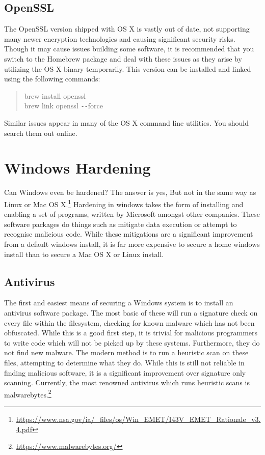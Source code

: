 \documentclass[a4paper,11pt]{report}
\begin{document}
			\subsection{OpenSSL}
				The OpenSSL version shipped with OS X is vastly out of date, not supporting many newer encryption technologies and causing significant security risks. 
				Though it may cause issues building some software, it is recommended that you switch to the Homebrew package and deal with these issues as they arise by utilizing the OS X binary temporarily.
				This version can be installed and linked using the following commands:
				\begin{quote}
					brew install openssl \\
					brew link openssl \verb+--+force
				\end{quote}
				Similar issues appear in many of the OS X command line utilities. 
				You should search them out online. 
	\section{Windows Hardening}
		Can Windows even be hardened? The answer is yes, But not in the same way as Linux or Mac OS X.\footnote{\url{https://www.nsa.gov/ia/\_files/os/Win\_EMET/I43V\_EMET\_Rationale\_v3.4.pdf}}
		Hardening in windows takes the form of installing and enabling a set of programs, written by Microsoft amongst other companies. 
		These software packages do things such as mitigate data execution or attempt to recognise malicious code. 
		While these mitigations are a significant improvement from a default windows install, it is far more expensive to secure a home windows install than to secure a Mac OS X or Linux install. 
		\subsection{Antivirus}
			The first and easiest means of securing a Windows system is to install an antivirus software package. 
			The most basic of these will run a signature check on every file within the filesystem, checking for known malware which has not been obfuscated. 
			While this is a good first step, it is trivial for malicious programmers to write code which will not be picked up by these systems. 
			Furthermore, they do not find new malware.
			The modern method is to run a heuristic scan on these files, attempting to determine what they do. 
			While this is still not reliable in finding malicious software, it is a significant improvement over signature only scanning. 
			Currently, the most renowned antivirus which runs heuristic scans is malwarebytes.\footnote{\url{https://www.malwarebytes.org/}}
\end{document}
